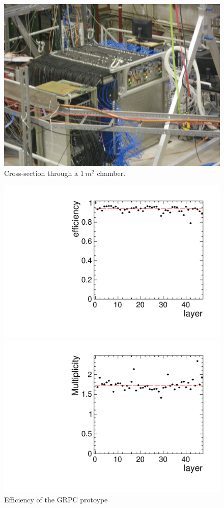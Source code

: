 \begin{figure}
\centering
\includegraphics[width=0.50\columnwidth]{Calorimeter/SDHCAL_GRPC/figures/prototype.JPG}
\caption{Cross-section through a $\SI{1}{m^2}$ chamber.}
\label{fig:Calorimeter:SDHCAL_GRPC:prototype}
\end{figure}

\begin{figure}
\centering
 \begin{minipage}[t]{0.49\textwidth}
 \includegraphics*[width=\textwidth,keepaspectratio]{Calorimeter/SDHCAL_GRPC/figures/eff_layer_august_fit.pdf}
	\caption{Efficiency of the GRPC protoype}
 \label{fig:Calorimeter:SDHCAL_GRPC:Eff}
 \end{minipage}
\hfill
 \begin{minipage}[t]{0.49\textwidth}
 \includegraphics*[width=\textwidth,keepaspectratio]{Calorimeter/SDHCAL_GRPC/figures/mul_layer_august_fit.pdf}

\end{minipage}
\end{figure}
